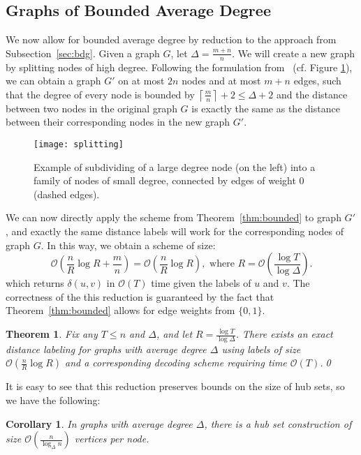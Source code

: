 \documentclass{article}[11pt,letter]
\newtheorem{theorem}[definition]{Theorem}
\newtheorem{corollary}[definition]{Corollary}
\newcommand{\bigo}{\mathcal{O}}
\newcommand{\symb}{R}
\newcommand{\cost}{\delta}
\begin{document}
\subsection{Graphs of Bounded Average Degree}
\label{sec:bounded_average}

We now allow for bounded average degree by reduction to the approach from Subsection~\ref{sec:bdg}. Given a graph $G$, let $\Delta=\frac{m+n}{n}$. We will create a new graph by splitting nodes of high degree. Following the formulation from~\cite[Lemma 4.2]{Stretch} (cf. Figure \ref{fig:splitting}), we can obtain a graph $G'$ on at most $2n$ nodes and at most $m+n$ edges, such that the degree of every node is bounded by $\left\lceil \frac{m}{n} \right\rceil+2 \le \Delta + 2$ and the distance between two nodes in the original graph $G$ is exactly the same as the distance between their corresponding nodes in the new graph $G'$.
\begin{figure}[t]
  \centering
    \vspace*{-2mm}
    \texttt{[image: splitting]}
    \vspace*{-2mm}
    \caption{Example of subdividing of a large degree node (on the left) into a family of nodes of small degree, connected by edges of weight 0 (dashed edges).}
    \label{fig:splitting}
\end{figure}
We can now directly apply the scheme from Theorem~\ref{thm:bounded} to graph $G'$, and exactly the same distance labels will work for the corresponding nodes of graph $G$. In this way, we obtain a scheme of size:
\[\bigo(\frac{n}{\symb}\log \symb + \frac{m}{n}) = \bigo(\frac{n}{\symb}\log \symb), \text{ where } \symb=\bigo(\frac{\log T}{\log\Delta}).\]
which returns $\cost(u,v)$ in $\bigo(T)$ time given the labels of $u$ and $v$. The correctness of the this reduction is guaranteed by the fact that Theorem~\ref{thm:bounded} allows for edge weights from $\{0,1\}$.

\begin{theorem}
Fix any  $T \le n$ and $\Delta$, and let $R = \frac{\log T}{\log \Delta}$. There exists an exact distance labeling for graphs with average degree $\Delta$ using labels of size $\bigo( \frac{n}{R} \log R)$
 and a corresponding decoding scheme requiring time $\bigo(T)$.\qed
\end{theorem}

It is easy to see that this reduction preserves bounds on the size of hub sets, so we have the following:
\begin{corollary}
In graphs with average degree $\Delta$, there is a hub set construction of size $\bigo(\frac{n}{\log_{\Delta} n})$ vertices per node.
\end{corollary}
\end{document}

